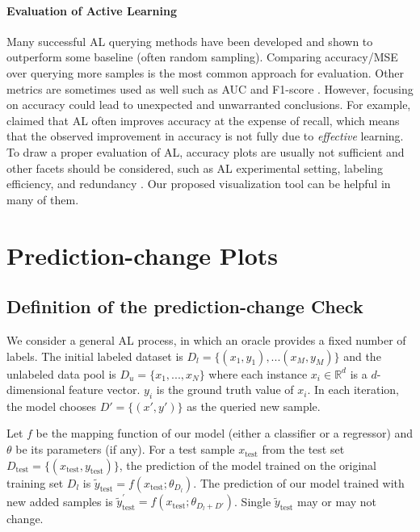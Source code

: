 \documentclass{article}
\begin{document}
\paragraph{Evaluation of Active Learning}
Many successful AL querying methods have been developed and shown to outperform some baseline (often random sampling). Comparing accuracy/MSE over querying more samples is the most common approach for evaluation. Other metrics are sometimes used as well such as AUC and F1-score \citep{Ramirez}. However, focusing on accuracy could lead to unexpected and unwarranted conclusions. For example, \citet{Ramirez} claimed that AL often improves accuracy at the expense of recall, which means that the observed improvement in accuracy is not fully due to \textit{effective} learning. %
To draw a proper evaluation of AL, accuracy plots are usually not sufficient and other facets should be considered, such as AL experimental setting, labeling efficiency, and redundancy \citep{beck2021effective}. Our proposed visualization tool can be helpful in many of them. 

\section{Prediction-change Plots}

\subsection{Definition of the prediction-change Check}
We consider a general AL process, in which an oracle provides a fixed number of labels. The initial labeled dataset is $D_{l}=\{(x_{1},y_{1}),...(x_{M},y_{M})\}$ and the unlabeled data pool is $D_{u}=\{x_{1},...,x_{N}\}$ where each instance $x_{i} \in \mathbb{R}^{d}$ is a $d$-dimensional feature vector. $y_{i}$ is the ground truth value of $x_{i}$. In each iteration, the model chooses $D'=\{(x',y')\}$ as the queried new sample. 

Let $f$ be the mapping function of our model (either a classifier or a regressor) and $\theta$ be its parameters (if any). For a test sample $x_{\text{test}}$ from the test set $D_{\text{test}} = \{(x_{\text{test}},y_{\text{test}})\}$, the prediction of the model trained on the original training set $D_{l}$ is $\tilde{y}_{\text{test}} = f( x_{\text{test}} ;\theta_{D_{l}})$. The prediction of our model trained with new added samples is $\tilde{y}^{'}_{\text{test}} = f( x_{\text{test}} ;\theta_{D_{l} + D'})$. Single $\tilde{y}_{\text{test}}$ may or may not change.
\end{document}
